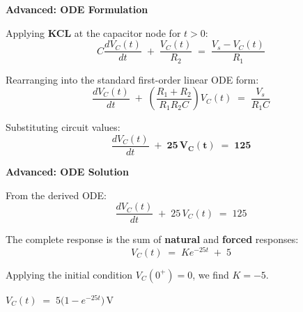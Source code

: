 \documentclass[12pt]{beamer}
\begin{document}
\begin{frame}{\textbf{Advanced: ODE Formulation}}
  \begin{center}
    \vfill
    Applying \textbf{KCL} at the capacitor node for $t > 0$:
    \[
      C\frac{dV_C(t)}{dt} \;+\; \frac{V_C(t)}{R_2} \;=\; \frac{V_s - V_C(t)}{R_1}
    \]

    \vspace{1.5em}
    Rearranging into the standard first-order linear ODE form:
    \[
      \frac{dV_C(t)}{dt} \;+\; \left( \frac{R_1 + R_2}{R_1 R_2 C} \right) V_C(t)
                         \;=\; \frac{V_s}{R_1 C}
    \]

    \vspace{1.5em}
    Substituting circuit values:
    \[
      \frac{dV_C(t)}{dt} \;+\; \mathbf{25\,V_C(t)} \;=\; \mathbf{125}
    \]
    \vfill
  \end{center}
\end{frame}

\begin{frame}{\textbf{Advanced: ODE Solution}}
  \begin{center}
    \vfill
    From the derived ODE:
    \[
      \frac{dV_C(t)}{dt} \;+\; 25\,V_C(t) \;=\; 125
    \]

    \vspace{1.5em}
    The complete response is the sum of \textbf{natural} and \textbf{forced} responses:
    \[
      V_C(t) \;=\; K e^{-25t} \;+\; 5
    \]

    \vspace{1.5em}
    Applying the initial condition $V_C(0^+) = 0$, we find $K = -5$.

    \vspace{2em}
    \Large\textbf{\textcolor{madblue}{$V_C(t) \;=\; 5\bigl(1 - e^{-25t}\bigr)\,\mathrm{V}$}}
    \vfill
  \end{center}
\end{frame}
\end{document}
